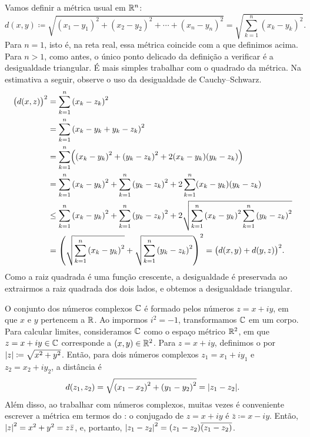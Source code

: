 \begin{example}
Vamos definir a métrica usual em ${\mathbb{R}}^n$:
\begin{equation*}
d(x,y) \coloneqq
\sqrt{
{(x_1-y_1)}^2 + 
{(x_2-y_2)}^2 + 
\cdots +
{(x_n-y_n)}^2
} =
\sqrt{
\sum_{k=1}^n
{(x_k-y_k)}^2 
} .
\end{equation*}
Para $n=1$, isto é, na reta real, essa métrica coincide com a que definimos
acima. Para $n > 1$, como antes, o único ponto delicado da definição a
verificar é a desigualdade triangular.
É mais simples trabalhar com o quadrado da métrica. Na estimativa a seguir,
observe o uso da desigualdade de Cauchy--Schwarz.
\begin{equation*}
\begin{split}
{\bigl(d(x,z)\bigr)}^2 & =
\sum_{k=1}^n
{(x_k-z_k)}^2 
\\
& =
\sum_{k=1}^n
{(x_k-y_k+y_k-z_k)}^2 
\\
& =
\sum_{k=1}^n
\Bigl(
{(x_k-y_k)}^2+{(y_k-z_k)}^2 + 2(x_k-y_k)(y_k-z_k)
\Bigr)
\\
& =
\sum_{k=1}^n
{(x_k-y_k)}^2
+
\sum_{k=1}^n
{(y_k-z_k)}^2 
+
2
\sum_{k=1}^n
(x_k-y_k)(y_k-z_k)
\\
& \leq
\sum_{k=1}^n
{(x_k-y_k)}^2
+
\sum_{k=1}^n
{(y_k-z_k)}^2 
+
2
\sqrt{
\sum_{k=1}^n
{(x_k-y_k)}^2
\sum_{k=1}^n
{(y_k-z_k)}^2
}
\\
& =
{\left(
\sqrt{
\sum_{k=1}^n
{(x_k-y_k)}^2
}
+
\sqrt{
\sum_{k=1}^n
{(y_k-z_k)}^2 
}
\right)}^2
=
{\bigl( d(x,y) + d(y,z) \bigr)}^2 .
\end{split}
\end{equation*}
Como a raiz quadrada é uma função crescente, a desigualdade é preservada ao
extrairmos a raiz quadrada dos dois lados, e obtemos a desigualdade triangular.
\end{example}

\begin{example}
O conjunto dos números complexos ${\mathbb{C}}$ é formado pelos números $z = x+iy$,
em que $x$ e $y$ pertencem a ${\mathbb{R}}$. Ao impormos $i^2 = -1$, transformamos
${\mathbb{C}}$ em um corpo.
Para calcular limites, consideramos ${\mathbb{C}}$ como o espaço métrico ${\mathbb{R}}^2$, em
que $z=x+iy \in {\mathbb{C}}$ corresponde a $(x,y) \in {\mathbb{R}}^2$.
Para $z=x+iy$, definimos o \emph{}
por $\lvert {z} \rvert \coloneqq \sqrt{x^2+y^2}$.
Então, para dois números complexos $z_1 = x_1 + iy_1$ e
$z_2 = x_2 + iy_2$, a distância é
\begin{equation*}
d(z_1,z_2) = \sqrt{{(x_1-x_2)}^2+ {(y_1-y_2)}^2} = \lvert {z_1-z_2} \rvert.
\end{equation*}
Além disso, ao trabalhar com números complexos, muitas vezes é conveniente
escrever a métrica em termos do \emph{}: o
conjugado de $z=x+iy$ é $\bar{z} \coloneqq x-iy$. Então,
${\lvert {z} \rvert}^2 = x^2 +y^2 = z\bar{z}$, e, portanto, ${\lvert {z_1-z_2} \rvert}^2 =
(z_1-z_2)\overline{(z_1-z_2)}$.
\end{example}

